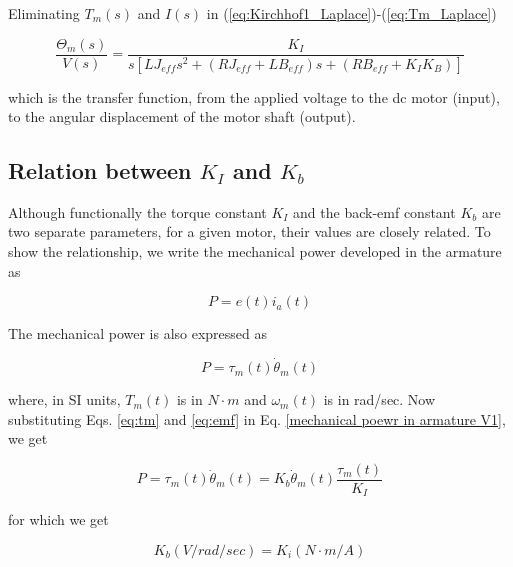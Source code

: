\noindent Eliminating $T_m(s)$ and $I(s)$ in (\ref{eq:Kirchhof1_Laplace})-(\ref{eq:Tm_Laplace})

\begin{equation} \label{eq:TF1}
	\frac{\Theta_m (s)}{V(s)} = \frac{K_I}{s\left[L J_{eff} s^2 + \left(R J_{eff} + L B_{eff}\right)s + \left(R B_{eff}+ K_I K_B\right)\right]}
\end{equation}

\noindent which is the transfer function, from the applied voltage to the dc motor (input), to the angular displacement of the motor shaft (output).

\newpage

\subsection{Relation between $K_I$ and $K_b$}

Although functionally the torque constant $K_I$ and the back-emf constant $K_b$ are two separate parameters, for a given motor, their values are closely related. To show the relationship, we write the mechanical power developed in the armature as

\begin{equation}	\label{mechanical poewr in armature V1}
	P = e(t) i_a(t)
\end{equation}

\noindent The mechanical power is also expressed as

\begin{equation} \label{mechanical power in armature V2}
	P = \tau_m(t) \dot{\theta}_m(t)
\end{equation}

\noindent where, in SI units, $T_m(t)$ is in $N \cdot m$ and $\omega_m(t)$ is in rad/sec. Now substituting Eqs. \ref{eq:tm} and \ref{eq:emf} in Eq. \ref{mechanical poewr in armature V1}, we get

\begin{equation} \label{relation Km Kb}
	P = \tau_m(t) \dot{\theta}_m(t) = K_b \dot{\theta}_m(t) \frac{\tau_m(t)}{K_I}
\end{equation}

\noindent for which we get 

\begin{equation} \label{relation}
	K_b (V/rad/sec) = K_i (N \cdot m/A)
\end{equation}
